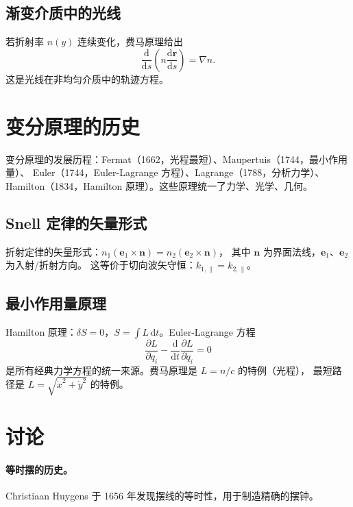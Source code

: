 \documentclass[UTF8,a4paper,11pt]{ctexart}
\begin{document}
\subsection{渐变介质中的光线}
\label{sub:graded}

若折射率 $n(y)$ 连续变化，费马原理给出
\begin{equation}
  \frac{\mathrm d}{\mathrm ds}\left(n\frac{\mathrm d\boldsymbol r}{\mathrm ds}\right)=\nabla n.
\end{equation}
这是光线在非均匀介质中的轨迹方程。

\section{变分原理的历史}
\label{sec:history}

变分原理的发展历程：Fermat（1662，光程最短）、Maupertuis（1744，最小作用量）、
Euler（1744，Euler-Lagrange 方程）、Lagrange（1788，分析力学）、
Hamilton（1834，Hamilton 原理）。这些原理统一了力学、光学、几何。

\subsection{Snell 定律的矢量形式}
\label{sub:snell-vector}

折射定律的矢量形式：$n_1(\boldsymbol e_1\times\boldsymbol n)=n_2(\boldsymbol e_2\times\boldsymbol n)$，
其中 $\boldsymbol n$ 为界面法线，$\boldsymbol e_1$、$\boldsymbol e_2$ 为入射/折射方向。
这等价于切向波矢守恒：$k_{1,\parallel}=k_{2,\parallel}$。

\subsection{最小作用量原理}
\label{sub:action}

Hamilton 原理：$\delta S=0$，$S=\int L\,\mathrm dt$。Euler-Lagrange 方程
\begin{equation}
  \frac{\partial L}{\partial q_i}-\frac{\mathrm d}{\mathrm dt}\frac{\partial L}{\partial\dot q_i}=0
\end{equation}
是所有经典力学方程的统一来源。费马原理是 $L=n/c$ 的特例（光程），
最短路径是 $L=\sqrt{\dot x^2+\dot y^2}$ 的特例。

\section{讨论}
\label{sec:discuss}

\paragraph{等时摆的历史。}
Christiaan Huygens 于 1656 年发现摆线的等时性，用于制造精确的摆钟。
\end{document}
